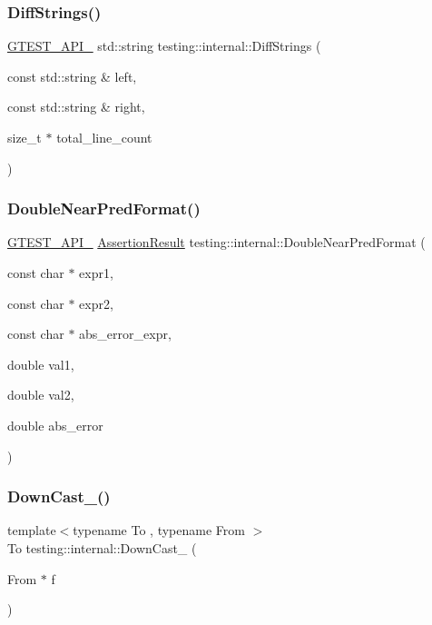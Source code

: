 \subsubsection{\texorpdfstring{DiffStrings()}{DiffStrings()}}
{\footnotesize\ttfamily \mbox{\hyperlink{gtest-port_8h_aa73be6f0ba4a7456180a94904ce17790}{G\+T\+E\+S\+T\+\_\+\+A\+P\+I\+\_\+}} std\+::string testing\+::internal\+::\+Diff\+Strings (\begin{DoxyParamCaption}\item[{const std\+::string \&}]{left,  }\item[{const std\+::string \&}]{right,  }\item[{size\+\_\+t $\ast$}]{total\+\_\+line\+\_\+count }\end{DoxyParamCaption})}

\mbox{\label{namespacetesting_1_1internal_aea60207c4cedc8946a70ada62e38da8f}} 
\subsubsection{\texorpdfstring{DoubleNearPredFormat()}{DoubleNearPredFormat()}}
{\footnotesize\ttfamily \mbox{\hyperlink{gtest-port_8h_aa73be6f0ba4a7456180a94904ce17790}{G\+T\+E\+S\+T\+\_\+\+A\+P\+I\+\_\+}} \mbox{\hyperlink{classtesting_1_1_assertion_result}{Assertion\+Result}} testing\+::internal\+::\+Double\+Near\+Pred\+Format (\begin{DoxyParamCaption}\item[{const char $\ast$}]{expr1,  }\item[{const char $\ast$}]{expr2,  }\item[{const char $\ast$}]{abs\+\_\+error\+\_\+expr,  }\item[{double}]{val1,  }\item[{double}]{val2,  }\item[{double}]{abs\+\_\+error }\end{DoxyParamCaption})}

\mbox{\label{namespacetesting_1_1internal_a1a1a1aed3fe00908b8a45d5ab4a33665}} 
\subsubsection{\texorpdfstring{DownCast\_()}{DownCast\_()}}
{\footnotesize\ttfamily template$<$typename To , typename From $>$ \\
To testing\+::internal\+::\+Down\+Cast\+\_\+ (\begin{DoxyParamCaption}\item[{From $\ast$}]{f }\end{DoxyParamCaption})\hspace{0.3cm}{\ttfamily [inline]}}

